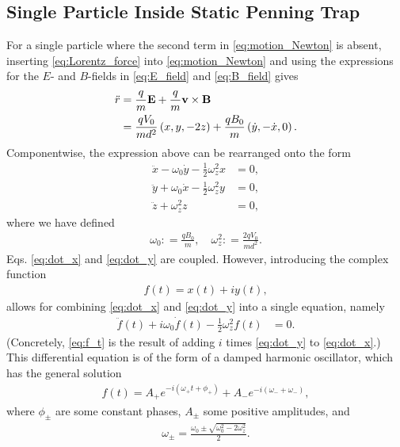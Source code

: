 \documentclass[english,notitlepage,reprint]{revtex4-2}  %
\renewcommand{\vec}[1]{\mathbf{#1}}
\newcommand{\eqdef}{\mathrel{\mathop:}=}
\begin{document}
\subsection{Single Particle Inside Static Penning Trap}
For a single particle where the second term in \eqref{eq:motion_Newton} is absent, inserting \eqref{eq:Lorentz_force} into \eqref{eq:motion_Newton} and using the expressions for the \(E\)- and \(B\)-fields in \eqref{eq:E_field} and \eqref{eq:B_field} gives 
\begin{align}
    \ddot{r} 
    &= \frac{q}{m}\vec{E} + \frac{q}{m}\vec{v}\times \vec{B}
    \notag \\
    &= \frac{qV_0}{md^2}\left(x, y, -2z\right) + \frac{qB_0}{m}\left(\dot{y}, -\dot{x}, 0\right).   \label{eq:ddotr_single_particle}
\end{align}
Componentwise, the expression above can be rearranged onto the form 
\begin{subequations}    \label{eq:eom_componentwise}
\begin{align}
    \ddot{x} - \omega_0 \dot{y} - \frac{1}{2}\omega_z^2x &=0, \label{eq:dot_x}\\ 
    \ddot{y} + \omega_0 \dot{x} - \frac{1}{2}\omega_z^2y &=0, \label{eq:dot_y}\\ 
    \ddot{z} + \omega_z^2z &= 0, \label{eq:dot_z}
\end{align}
\end{subequations}
where we have defined 
\begin{align}
    \omega_0 \eqdef \frac{qB_0}{m}, \quad \omega_z^2 \eqdef \frac{2qV_0}{md^2}. \label{eq:def:omega_0_omega_z}
\end{align}
Eqs. \eqref{eq:dot_x} and \eqref{eq:dot_y} are coupled. However, introducing the complex function 
\begin{align}
    f(t)=x(t) + iy(t),
\end{align}
allows for combining \eqref{eq:dot_x} and \eqref{eq:dot_y} into a single equation, namely
\begin{align}
    \ddot{f}(t) + i\omega_0 \dot{f}(t) -\frac{1}{2}\omega_z^2 f(t) &= 0.    \label{eq:f_t}
\end{align}
(Concretely, \eqref{eq:f_t} is the result of adding \(i\) times \eqref{eq:dot_y} to \eqref{eq:dot_x}.) This differential equation is of the form of a damped harmonic oscillator, which has the general solution 
\begin{align}
    f(t) = A_{+}e^{-i(\omega_+ t + \phi_+)} + A_{-}e^{-i(\omega_- + \omega_-)},
\end{align}
where \(\phi_{\pm}\) are some constant phases, \(A_{\pm}\) some positive amplitudes, and 
\begin{align}
    \omega_{\pm} = \frac{\omega_0 \pm \sqrt{\omega_0^2 - 2\omega_z^2}}{2}.
\end{align}
\end{document}
